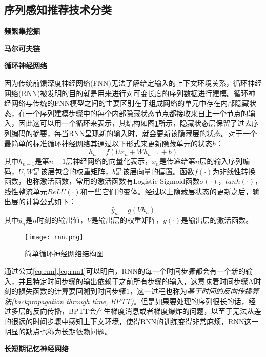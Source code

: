 \subsection{序列感知推荐技术分类}

\textbf{频繁集挖掘}

\textbf{马尔可夫链}

\textbf{循环神经网络}

因为传统前馈深度神经网络(FNN)无法了解给定输入的上下文环境关系，循环神经网络(RNN)\cite{RNN1994}被发明的目的就是用来进行对可变长度的序列数据进行建模。循环神经网络与传统的FNN模型之间的主要区别在于组成网络的单元中存在内部隐藏状态，在一个序列建模步骤中的每个内部隐藏状态节点都接收来自上一个节点的输入，因此这可以用一个循环来表示，其结构如图\ref{fig:rnn}所示，隐藏状态层保留了过去序列编码的摘要，每当RNN呈现新的输入时，就会更新该隐藏层的状态。对于一个最简单的标准循环神经网络其通过以下形式来更新隐藏单元的状态$h$：
\begin{equation}
  \label{eq:rnn}
  h_{n} = f \left(Ux_{n} + Wh_{n-1} + b \right)
\end{equation}
其中$h_{n-1}$是第$n-1$层神经网络的向量化表示，$x_{n}$是传递给第$n$层的输入序列编码，$U,W$是该层包含的权重矩阵，$b$是该层向量的偏置。函数$f(\cdot)$为非线性转换函数，也称激活函数，常用的激活函数有Logistic Sigmoid函数$\sigma(\cdot )$，$tanh(\cdot)$，线性整流单元$ReLU(\cdot)$和一些它们的变体。经过以上隐藏层状态的更新之后，输出层的计算公式如下：
\begin{equation}
  \label{eq:rnn1}
  \hat{y}_{n} = g(Vh_{n})
\end{equation}
其中$\hat{y}_{n}$是$n$时刻的输出值，$V$是输出层的权重矩阵，$g(\cdot)$是输出层的激活函数。

\begin{figure}[htb]%
  \centering
  \texttt{[image: rnn.png]}\\
  \caption{简单循环神经网络结构图}
  \label{fig:rnn}
\end{figure}

通过公式\ref{eq:rnn},\ref{eq:rnn1}可以明白，RNN的每一个时间步骤都会有一个新的输入，并且特定时间步骤的输出依赖于之前所有步骤的输入，这意味着时间步骤$N$时刻的损失函数的计算要回溯到时间步骤$1$，这一过程也称为\textit{基于时间的反向传播算法(backpropagation through time, BPTT)}。但是如果要处理的序列很长的话，经过多层的反向传播，BPTT会产生梯度消息或者梯度爆炸的问题，以至于无法从差的很远的时间步骤中感知上下文环境，使得RNN的训练变得非常麻烦，RNN这一明显的缺点也称为长期依赖问题。

\textbf{长短期记忆神经网络}

